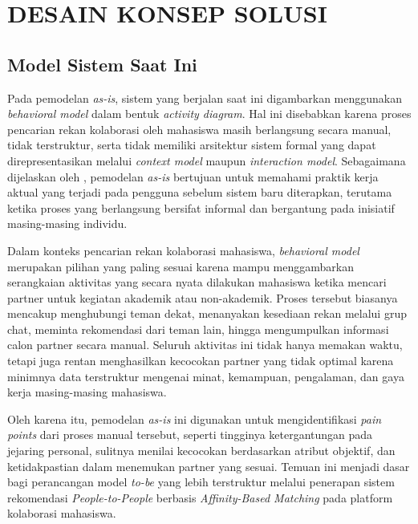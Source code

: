 \chapter{DESAIN KONSEP SOLUSI}
\label{chap:desain-konsep-solusi}

\section{Model Sistem Saat Ini}
Pada pemodelan \textit{as-is}, sistem yang berjalan saat ini digambarkan menggunakan \textit{behavioral model} dalam bentuk \textit{activity diagram}. Hal ini disebabkan karena proses pencarian rekan kolaborasi oleh mahasiswa masih berlangsung secara manual, tidak terstruktur, serta tidak memiliki arsitektur sistem formal yang dapat direpresentasikan melalui \textit{context model} maupun \textit{interaction model}. Sebagaimana dijelaskan oleh \textcite{sommervilleSoftwareEngineering2016}, pemodelan \textit{as-is} bertujuan untuk memahami praktik kerja aktual yang terjadi pada pengguna sebelum sistem baru diterapkan, terutama ketika proses yang berlangsung bersifat informal dan bergantung pada inisiatif masing-masing individu.

Dalam konteks pencarian rekan kolaborasi mahasiswa, \textit{behavioral model} merupakan pilihan yang paling sesuai karena mampu menggambarkan serangkaian aktivitas yang secara nyata dilakukan mahasiswa ketika mencari partner untuk kegiatan akademik atau non-akademik. Proses tersebut biasanya mencakup menghubungi teman dekat, menanyakan kesediaan rekan melalui grup chat, meminta rekomendasi dari teman lain, hingga mengumpulkan informasi calon partner secara manual. Seluruh aktivitas ini tidak hanya memakan waktu, tetapi juga rentan menghasilkan kecocokan partner yang tidak optimal karena minimnya data terstruktur mengenai minat, kemampuan, pengalaman, dan gaya kerja masing-masing mahasiswa.

Oleh karena itu, pemodelan \textit{as-is} ini digunakan untuk mengidentifikasi \textit{pain points} dari proses manual tersebut, seperti tingginya ketergantungan pada jejaring personal, sulitnya menilai kecocokan berdasarkan atribut objektif, dan ketidakpastian dalam menemukan partner yang sesuai. Temuan ini menjadi dasar bagi perancangan model \textit{to-be} yang lebih terstruktur melalui penerapan sistem rekomendasi \textit{People-to-People} berbasis \textit{Affinity-Based Matching} pada platform kolaborasi mahasiswa.

